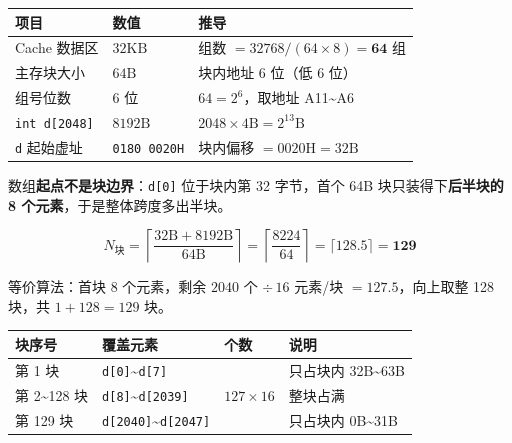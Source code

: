 \documentclass[11pt,a4paper]{ctexart}
\begin{document}

\begin{center}\small
\begin{tabularx}{\linewidth}{@{}>{\raggedright\arraybackslash}X>{\raggedright\arraybackslash}X>{\raggedright\arraybackslash}X@{}}
\toprule
项目 & 数值 & 推导 \\
\midrule
Cache 数据区 & $32\mathrm{KB}$ & 组数 $=32768/(64\times 8)=\mathbf{64}$ 组 \\
主存块大小 & $64\mathrm{B}$ & 块内地址 $6$ 位（低 6 位） \\
组号位数 & $6$ 位 & $64=2^6$，取地址 A11\textasciitilde{}A6 \\
\texttt{int d[2048]} & $8192\mathrm{B}$ & $2048\times 4\mathrm{B}=2^{13}\mathrm{B}$ \\
\texttt{d} 起始虚址 & \texttt{0180 0020H} & 块内偏移 $=0020\mathrm{H}=32\mathrm{B}$ \\
\bottomrule
\end{tabularx}
\end{center}



数组\textbf{起点不是块边界}：\texttt{d[0]} 位于块内第 32 字节，首个 64B 块只装得下\textbf{后半块的 8 个元素}，于是整体跨度多出半块。

\[
N_{\text{块}}=\left\lceil\frac{32\mathrm{B}+8192\mathrm{B}}{64\mathrm{B}}\right\rceil=\left\lceil\frac{8224}{64}\right\rceil=\lceil 128.5\rceil=\mathbf{129}
\]

等价算法：首块 8 个元素，剩余 $2040$ 个 $\div\,16$ 元素/块 $=127.5$，向上取整 128 块，共 $1+128=129$ 块。

\begin{center}\small
\begin{tabularx}{\linewidth}{@{}>{\raggedright\arraybackslash}X>{\raggedright\arraybackslash}X>{\raggedright\arraybackslash}X>{\raggedright\arraybackslash}X@{}}
\toprule
块序号 & 覆盖元素 & 个数 & 说明 \\
\midrule
第 1 块 & \texttt{d[0]}\textasciitilde{}\texttt{d[7]} & 8 & 只占块内 32B\textasciitilde{}63B \\
第 2\textasciitilde{}128 块 & \texttt{d[8]}\textasciitilde{}\texttt{d[2039]} & $127\times16$ & 整块占满 \\
第 129 块 & \texttt{d[2040]}\textasciitilde{}\texttt{d[2047]} & 8 & 只占块内 0B\textasciitilde{}31B \\
\bottomrule
\end{tabularx}
\end{center}
\end{document}

